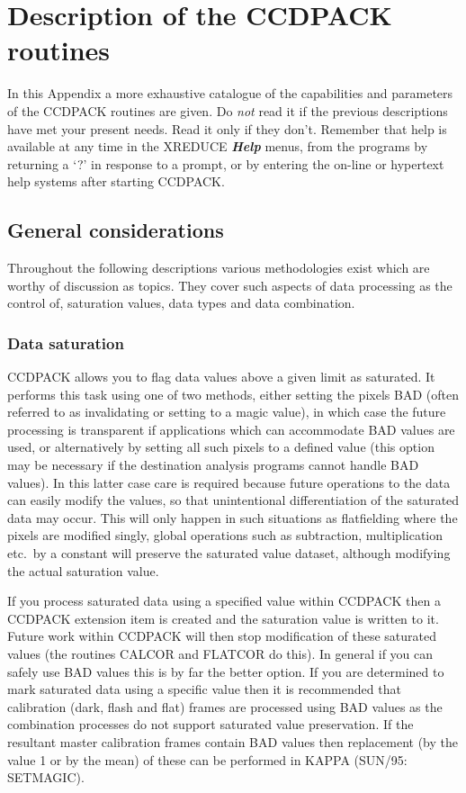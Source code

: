 \documentclass[twoside,11pt]{article}
\newcommand{\htmlref}[2]{#1}
\newcommand{\xref}[3]{#1}
\newcommand{\xlabel}[1]{}
\renewcommand{\_}{\texttt{\symbol{95}}}
\newcommand{\menu}[1]{{\small \bf \em #1}}
\newcommand{\xroutine}[1]{\htmlref{{\sc #1}}{#1}}
\begin{document}
\section{Description of the CCDPACK routines \label{app:description}}

In this Appendix a more exhaustive catalogue of the capabilities and parameters
of the CCDPACK routines are given. Do {\em{not}} read it if the previous
descriptions have met your present needs. Read it only if they don't. Remember
that help is available at any time in the \xroutine{XREDUCE}
\menu{Help} menus, from the programs by returning a `?' in response to a prompt,
or by entering the on-line or hypertext help systems after starting CCDPACK.

\subsection{General considerations}

Throughout the following descriptions various methodologies exist which are
worthy of discussion as topics. They cover such aspects of data processing as
the control of, saturation values, data types and data combination.

\subsubsection{Data saturation \xlabel{CCDsaturate}}

CCDPACK allows you to flag data values above a given
limit as saturated. It performs this task using one of two methods,
either setting the pixels BAD (often referred to as invalidating or
setting to a magic value), in which case the future processing is
transparent if applications which can accommodate BAD values are used,
or alternatively by setting all such pixels to a defined value (this
option may be necessary if the destination analysis programs cannot
handle BAD values). In this latter case care is required because future
operations to the data can easily modify the values, so that
unintentional differentiation of the saturated data may occur. This will
only happen in such situations as flatfielding where the pixels are
modified singly, global operations such as subtraction, multiplication
etc.\ by a constant will preserve the saturated value dataset, although
modifying the actual saturation value.

If you process saturated data using a specified value within CCDPACK
then a CCDPACK extension item is created and the saturation value is
written to it. Future work within CCDPACK will then stop modification of
these saturated values (the routines \xroutine{CALCOR} and \xroutine{FLATCOR} do this). In
general if you can safely use BAD values this is by far the better
option. If you are determined to mark saturated data using a specific
value then it is recommended that calibration (dark, flash and flat)
frames are processed using BAD values as the combination processes
do not support saturated value preservation. If the resultant master
calibration frames contain BAD values then replacement (by the value 1
or by the mean) of these can be performed in KAPPA
(SUN/95: \xref{SETMAGIC}{sun95}{}).
\end{document}
